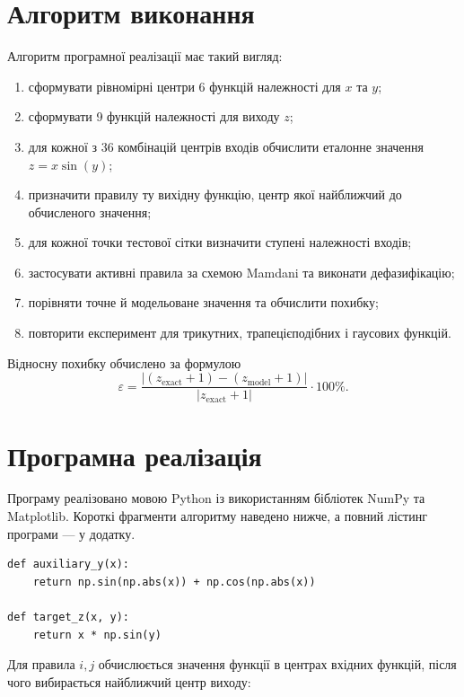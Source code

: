 \documentclass[12pt,a4paper]{article}
\begin{document}
\section{Алгоритм виконання}

Алгоритм програмної реалізації має такий вигляд:
\begin{enumerate}[leftmargin=*]
  \item сформувати рівномірні центри 6 функцій належності для $x$ та $y$;
  \item сформувати 9 функцій належності для виходу $z$;
  \item для кожної з 36 комбінацій центрів входів обчислити еталонне значення $z=x\sin(y)$;
  \item призначити правилу ту вихідну функцію, центр якої найближчий до обчисленого значення;
  \item для кожної точки тестової сітки визначити ступені належності входів;
  \item застосувати активні правила за схемою Mamdani та виконати дефазифікацію;
  \item порівняти точне й модельоване значення та обчислити похибку;
  \item повторити експеримент для трикутних, трапецієподібних і гаусових функцій.
\end{enumerate}

Відносну похибку обчислено за формулою
\begin{equation}
  \varepsilon=\frac{|(z_{\text{exact}}+1)-(z_{\text{model}}+1)|}{|z_{\text{exact}}+1|}\cdot100\%.
  \label{eq:error}
\end{equation}

\section{Програмна реалізація}

Програму реалізовано мовою Python із використанням бібліотек NumPy та Matplotlib. Короткі фрагменти алгоритму наведено нижче, а повний лістинг програми --- у додатку.

\begin{listing}[H]
\begin{verbatim}
def auxiliary_y(x):
    return np.sin(np.abs(x)) + np.cos(np.abs(x))

def target_z(x, y):
    return x * np.sin(y)
\end{verbatim}
\caption{Функції варіанта}
\end{listing}

Для правила $i,j$ обчислюється значення функції в центрах вхідних функцій, після чого вибирається найближчий центр виходу:
\end{document}
